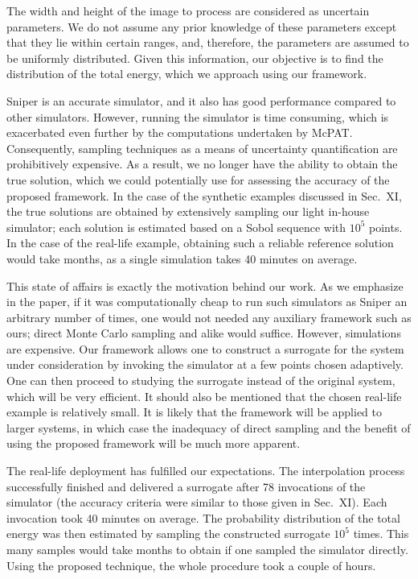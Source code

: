 \begin{authors}
The width and height of the image to process are considered as uncertain
parameters. We do not assume any prior knowledge of these parameters except that
they lie within certain ranges, and, therefore, the parameters are assumed to be
uniformly distributed. Given this information, our objective is to find the
distribution of the total energy, which we approach using our framework.

Sniper is an accurate simulator, and it also has good performance compared to
other simulators. However, running the simulator is time consuming, which is
exacerbated even further by the computations undertaken by McPAT. Consequently,
sampling techniques as a means of uncertainty quantification are prohibitively
expensive. As a result, we no longer have the ability to obtain the true
solution, which we could potentially use for assessing the accuracy of the
proposed framework. In the case of the synthetic examples discussed in Sec.~XI,
the true solutions are obtained by extensively sampling our light in-house
simulator; each solution is estimated based on a Sobol sequence with $10^5$
points. In the case of the real-life example, obtaining such a reliable
reference solution would take months, as a single simulation takes 40 minutes on
average.

This state of affairs is exactly the motivation behind our work. As we emphasize
in the paper, if it was computationally cheap to run such simulators as Sniper
an arbitrary number of times, one would not needed any auxiliary framework such
as ours; direct Monte Carlo sampling and alike would suffice. However,
simulations are expensive. Our framework allows one to construct a surrogate for
the system under consideration by invoking the simulator at a few points chosen
adaptively. One can then proceed to studying the surrogate instead of the
original system, which will be very efficient. It should also be mentioned that
the chosen real-life example is relatively small. It is likely that the
framework will be applied to larger systems, in which case the inadequacy of
direct sampling and the benefit of using the proposed framework will be much
more apparent.

The real-life deployment has fulfilled our expectations. The interpolation
process successfully finished and delivered a surrogate after 78 invocations of
the simulator (the accuracy criteria were similar to those given in Sec.~XI).
Each invocation took 40 minutes on average. The probability distribution of the
total energy was then estimated by sampling the constructed surrogate $10^5$
times. This many samples would take months to obtain if one sampled the
simulator directly. Using the proposed technique, the whole procedure took a
couple of hours.


\end{authors}
